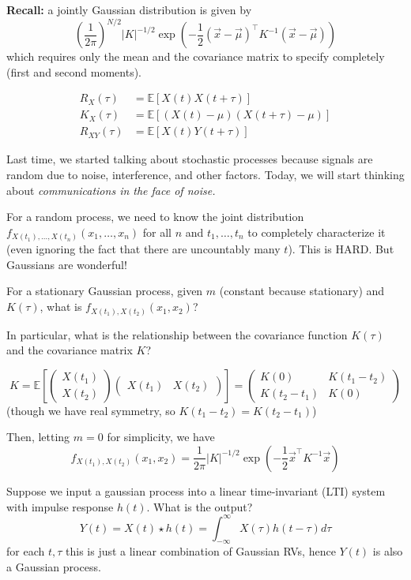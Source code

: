 \documentclass[12pt]{report}
\newcommand{\E}{\mathbb{E}}
\newcommand{\abs}[1]{\left\vert #1 \right\vert}
\newcommand*{\tbf}[1]{\ifmmode\mathbf{#1}\else\textbf{#1}\fi}
\begin{document}
\tbf{Recall:} a jointly Gaussian distribution is given by
\[\left(\frac{1}{2\pi}\right)^{N/2} \abs{K}^{-1/2} \exp\left(-\frac{1}{2} (\vec x - \vec \mu)^{\top} K^{-1} (\vec x - \vec \mu)\right) \]
which requires only the mean and the covariance matrix to specify completely (first and second moments).

\begin{align*}
    R_X(\tau) &= \E[X(t) X(t + \tau)]\\
    K_X(\tau) &= \E[(X(t) - \mu)(X(t + \tau) - \mu)]\\ 
    R_{XY}(\tau) &= \E[X(t) Y(t + \tau)]
\end{align*}

Last time, we started talking about stochastic processes because signals are random due to noise, interference, and other factors. Today, we will start thinking about \emph{communications in the face of noise.}

For a random process, we need to know the joint distribution $f_{X(t_1), \dots, X(t_n)}(x_1, \dots, x_n)$ for all $n$ and $t_1, \dots, t_n$ to completely characterize it (even ignoring the fact that there are uncountably many $t$). This is HARD. But Gaussians are wonderful! 

For a stationary Gaussian process, given $m$ (constant because stationary) and $K(\tau)$, what is $f_{X(t_1), X(t_2)}(x_1, x_2)$?

In particular, what is the relationship between the covariance function $K(\tau)$ and the covariance matrix $K$? 

\[K = \E\left[\begin{pmatrix}
    X(t_1)\\ X(t_2)
\end{pmatrix}\begin{pmatrix}
    X(t_1) & X(t_2)
\end{pmatrix}\right] = \begin{pmatrix}
    K(0) & K(t_1 - t_2)\\
    K(t_2 - t_1) & K(0)
\end{pmatrix}\]
(though we have real symmetry, so $K(t_1 - t_2) = K(t_2 - t_1)$)

Then, letting $m = 0$ for simplicity, we have
\[f_{X(t_1), X(t_2)}(x_1, x_2) = \frac{1}{2\pi} \abs{K}^{-1/2} \exp\left(-\frac{1}{2} \vec x^{\top} K^{-1} \vec x\right)\]

Suppose we input a gaussian process into a linear time-invariant (LTI) system with impulse response $h(t)$. What is the output?
\[Y(t) = X(t) \star h(t) = \int_{-\infty}^{\infty} X(\tau) h(t - \tau) d\tau \]
for each $t, \tau$ this is just a linear combination of Gaussian RVs, hence $Y(t)$ is also a Gaussian process. 
\end{document}
